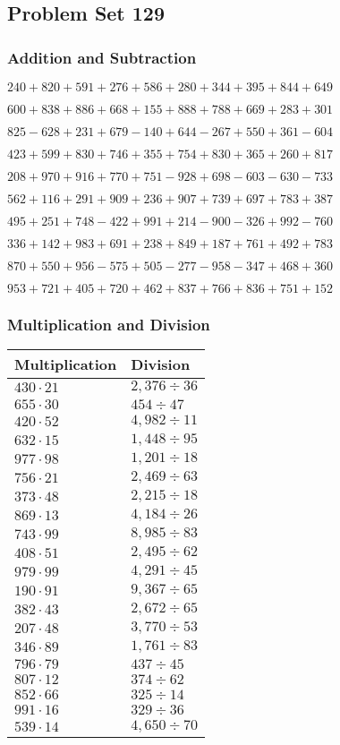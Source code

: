 \hypertarget{problem-set-129}{%
\subsection{Problem Set 129}\label{problem-set-129}}

\hypertarget{addition-and-subtraction}{%
\subsubsection{Addition and
Subtraction}\label{addition-and-subtraction}}

\(240 +820 +591 +276 +586 +280 +344 +395 +844 +649\)

\(600 +838 +886 +668 +155 +888 +788 +669 +283 +301\)

\(825 - 628 +231 +679 - 140 +644 - 267 +550 +361 - 604\)

\(423 +599 +830 +746 +355 +754 +830 +365 +260 +817\)

\(208 +970 +916 +770 +751 - 928 +698 - 603 - 630 - 733\)

\(562 +116 +291 +909 +236 +907 +739 +697 +783 +387\)

\(495 +251 +748 - 422 +991 +214 - 900 - 326 +992 - 760\)

\(336 +142 +983 +691 +238 +849 +187 +761 +492 +783\)

\(870 +550 +956 - 575 +505 - 277 - 958 - 347 +468 +360\)

\(953 +721 +405 +720 +462 +837 +766 +836 +751 +152\)

\hypertarget{multiplication-and-division}{%
\subsubsection{Multiplication and
Division}\label{multiplication-and-division}}

\begin{longtable}[]{@{}ll@{}}
\toprule
Multiplication & Division\tabularnewline
\midrule
\endhead
\(430 \cdot 21\) & \(2,376 ÷36\)\tabularnewline
\(655 \cdot 30\) & \(454 ÷ 47\)\tabularnewline
\(420 \cdot 52\) & \(4,982÷11\)\tabularnewline
\(632 \cdot 15\) & \(1,448÷95\)\tabularnewline
\(977 \cdot 98\) & \(1,201÷18\)\tabularnewline
\(756 \cdot 21\) & \(2,469÷63\)\tabularnewline
\(373 \cdot 48\) & \(2,215÷18\)\tabularnewline
\(869 \cdot 13\) & \(4,184÷26\)\tabularnewline
\(743 \cdot 99\) & \(8,985÷83\)\tabularnewline
\(408 \cdot 51\) & \(2,495÷62\)\tabularnewline
\(979 \cdot 99\) & \(4,291÷45\)\tabularnewline
\(190 \cdot 91\) & \(9,367÷65\)\tabularnewline
\(382 \cdot 43\) & \(2,672÷65\)\tabularnewline
\(207 \cdot 48\) & \(3,770÷53\)\tabularnewline
\(346 \cdot 89\) & \(1,761÷83\)\tabularnewline
\(796 \cdot 79\) & \(437÷45\)\tabularnewline
\(807 \cdot 12\) & \(374÷62\)\tabularnewline
\(852 \cdot 66\) & \(325÷14\)\tabularnewline
\(991 \cdot 16\) & \(329÷36\)\tabularnewline
\(539 \cdot 14\) & \(4,650÷70\)\tabularnewline
\bottomrule
\end{longtable}
